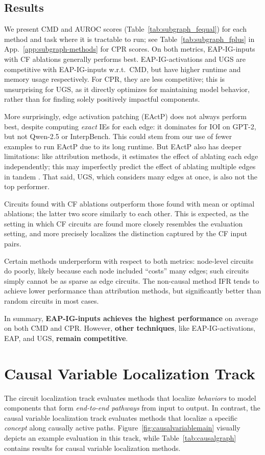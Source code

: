 \documentclass{article}
\theoremstyle{plain}
\theoremstyle{definition}
\theoremstyle{remark}
\newcommand{\variabletrack}{causal variable localization track}
\newcommand{\circuittrack}{circuit localization track}
\begin{document}
\subsection{Results}
We present \textsf{CMD} and AUROC scores (Table~\ref{tab:subgraph_fequal}) for each method and task where it is tractable to run; see Table~\ref{tab:subgraph_fplus} in App.~\ref{app:subgraph-methods} for \textsf{CPR} scores. On both metrics, EAP-IG-inputs with CF ablations generally performs best. EAP-IG-activations and UGS are competitive with EAP-IG-inputs w.r.t.\ \textsf{CMD}, but have higher runtime and memory usage respectively. For \textsf{CPR}, they are less competitive; this is unsurprising for UGS, as it directly optimizes for maintaining model behavior, rather than for finding solely positively impactful components. 

More surprisingly, edge activation patching (EActP) does not always perform best, despite computing \emph{exact} IEs for each edge: it dominates for IOI on GPT-2, but not Qwen-2.5 or InterpBench. This could stem from our use of fewer examples to run EActP due to its long runtime. But EActP also has deeper limitations: like attribution methods, it estimates the effect of ablating each edge independently; this may imperfectly predict the effect of ablating multiple edges in tandem \citep{mueller2024missed}. That said, UGS, which considers many edges at once, is also not the top performer.

Circuits found with CF ablations outperform those found with mean or optimal ablations; the latter two score similarly to each other. This is expected, as the setting in which CF circuits are found more closely resembles the evaluation setting, and more precisely localizes the distinction captured by the CF input pairs.

Certain methods underperform with respect to both metrics: node-level circuits do poorly, likely because each node included ``costs'' many edges; such circuits simply cannot be as sparse as edge circuits. The non-causal method IFR tends to achieve lower performance than attribution methods, but significantly better than random circuits in most cases. 

In summary, \textbf{EAP-IG-inputs achieves the highest performance} on average on both \textsf{CMD} and \textsf{CPR}. However, \textbf{other techniques}, like EAP-IG-activations, EAP, and UGS, \textbf{remain competitive}.

\section{Causal Variable Localization Track}\label{sec:causal_graph}
The \circuittrack{} evaluates methods that localize \textit{behaviors} to model components that form \textit{end-to-end pathways} from input to output. In contrast, the \variabletrack{} evaluates methods that localize a specific \textit{concept}
along causally active paths. Figure~\ref{fig:causalvariablemain} visually depicts an example evaluation in this track, while Table~\ref{tab:causalgraph} contains results for causal variable localization methods.
 
\end{document}
